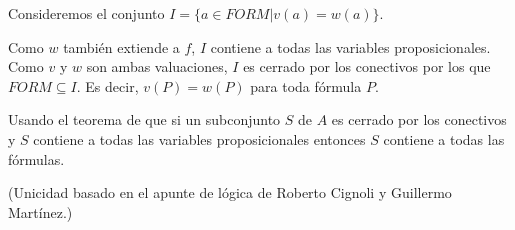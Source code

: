 \begin{questions}
\begin{solution}
\begin{enumerate}[a)]
 Consideremos el conjunto $I = \{a\in FORM | v(a) = w(a) \}$. 
 
 Como $w$ tambi\'en extiende a $f$, $I$ contiene a todas las variables proposicionales. Como $v$ y $w$ son ambas valuaciones, $I$ es cerrado por los conectivos por los que $FORM \subseteq I$. Es decir, $v(P) =w(P)$ para toda f\'ormula $P$. 
 
 Usando el teorema de que si un subconjunto $S$ de $A$ es cerrado por los conectivos y $S$ contiene a todas las variables proposicionales entonces $S$ contiene a todas las f\'ormulas. 
 
 (Unicidad basado en el apunte de lógica de Roberto Cignoli y Guillermo Martínez.)
\end{enumerate}

\end{solution}

\end{questions}